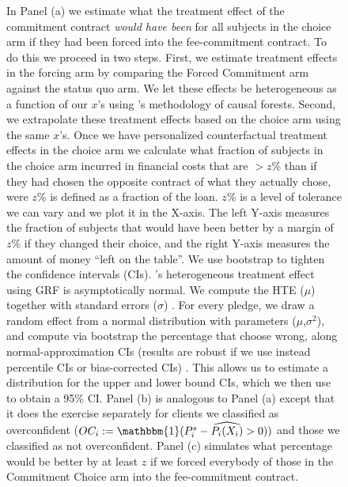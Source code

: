 \documentclass[oneside,11pt]{article}
\begin{document}
\begin{figure}[H]
\begin{center}
    \end{center}
        \scriptsize
        In Panel (a) we estimate what the treatment effect of the commitment contract \textit{would have been} for all subjects in the choice arm if they had been forced into the fee-commitment contract. To do this we proceed in two steps. First, we estimate treatment effects in the forcing arm by comparing the Forced Commitment arm against the status quo arm. We let these effects be heterogeneous as a function of our $x$'s using \cite{atheygrf}'s methodology of causal forests. Second, we extrapolate these treatment effects based on the choice arm using the same $x$'s. Once we have personalized counterfactual treatment effects in the choice arm we calculate what fraction of subjects in the choice arm incurred in financial costs that are  $> z$\% than if they had chosen the opposite contract of what they actually chose, were $z$\% is defined as a fraction of the loan. $z$\% is a level of tolerance we can vary and we plot it in the X-axis. The left Y-axis measures the fraction of subjects that would have been better by a margin of $z$\% if they changed their choice, and the right Y-axis measures the amount of money ``left on the table''. We use bootstrap to tighten the confidence intervals (CIs). \cite{atheygrf}'s heterogeneous treatment effect using GRF is asymptotically normal. We compute the HTE ($\mu$) together with standard errors ($\sigma$) . For every pledge, we draw a random effect from a normal distribution with parameters ($\mu$,$\sigma^2$), and compute via bootstrap the percentage that choose wrong, along normal-approximation CIs (results are robust if we use instead percentile CIs or bias-corrected CIs) . This allows us to estimate a distribution for the upper and lower bound CIs, which we then use to obtain a 95\% CI. Panel (b) is analogous to Panel (a) except that it does the exercise separately for clients we classified as overconfident ($OC_i:=\mathbbm{1}(P^s_i-\widehat{P_i(X_i)}>0))$ and those we classified as not overconfident. Panel (c) simulates what percentage would be better by at least $z$ if we forced everybody of those in the Commitment Choice arm into the fee-commitment contract.

\end{figure}
\end{document}
